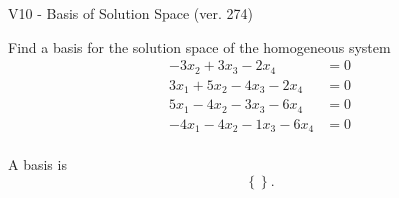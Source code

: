 \begin{exercise}
  \begin{exerciseTitle}V10 - Basis of Solution Space (ver. 274)\end{exerciseTitle}
  \begin{exerciseStatement}
    Find a basis for the solution space of the homogeneous system 
\begin{align*}
 -3 x_ 2 + 3 x_ 3 -2 x_ 4 &= 0  \\ 
  3 x_ 1 + 5 x_ 2 -4 x_ 3 -2 x_ 4 &= 0  \\ 
  5 x_ 1 -4 x_ 2 -3 x_ 3 -6 x_ 4 &= 0  \\ 
  -4 x_ 1 -4 x_ 2 -1 x_ 3 -6 x_ 4 &= 0  \\ 
 \end{align*}


 
  \end{exerciseStatement}

  \begin{exerciseAnswer}
   A basis is   
\[\left\{\right\}.\]

  


  \end{exerciseAnswer}
\end{exercise}